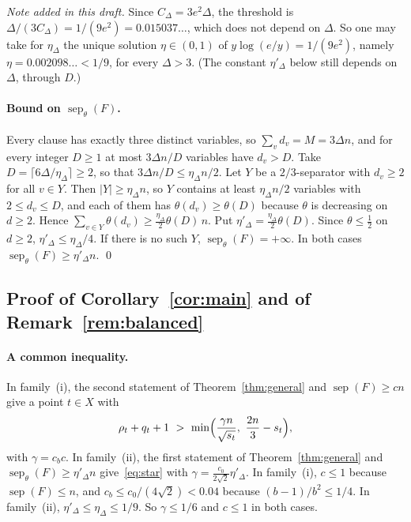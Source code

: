 \documentclass[11pt,a4paper]{article}
\theoremstyle{definition}
\theoremstyle{remark}
\newcommand{\sep}{\operatorname{sep}}
\newcommand{\sepw}{\operatorname{sep}_{\theta}}
\begin{document}
\emph{Note added in this draft.} Since $C_\Delta=3e^2\Delta$, the threshold is
$\Delta/(3C_\Delta)=1/(9e^2)=0.015037\ldots$, which does not depend on $\Delta$. So one may
take for $\eta_\Delta$ the unique solution $\eta\in(0,1)$ of $y\log(e/y)=1/(9e^2)$, namely
$\eta=0.002098\ldots<1/9$, for every $\Delta>3$. (The constant $\eta'_\Delta$ below still
depends on $\Delta$, through $D$.)

\paragraph{Bound on $\sepw(F)$.} Every clause has exactly three distinct variables, so
$\sum_vd_v=M=3\Delta n$, and for every integer $D\ge1$ at most $3\Delta n/D$ variables have
$d_v>D$. Take $D=\lceil6\Delta/\eta_\Delta\rceil\ge2$, so that $3\Delta n/D\le\eta_\Delta n/2$.
Let $Y$ be a $2/3$-separator with $d_v\ge2$ for all $v\in Y$. Then $|Y|\ge\eta_\Delta n$, so
$Y$ contains at least $\eta_\Delta n/2$ variables with $2\le d_v\le D$, and each of them has
$\theta(d_v)\ge\theta(D)$ because $\theta$ is decreasing on $d\ge2$. Hence
$\sum_{v\in Y}\theta(d_v)\ge\frac{\eta_\Delta}{2}\theta(D)\,n$. Put
$\eta'_\Delta=\frac{\eta_\Delta}{2}\theta(D)$. Since $\theta\le\frac12$ on $d\ge2$,
$\eta'_\Delta\le\eta_\Delta/4$. If there is no such $Y$, $\sepw(F)=+\infty$. In both cases
$\sepw(F)\ge\eta'_\Delta n$. \qed

\subsection{Proof of Corollary~\ref{cor:main} and of Remark~\ref{rem:balanced}}
\label{sec:proofcor}

\paragraph{A common inequality.} In family~(i), the second statement of
Theorem~\ref{thm:general} and $\sep(F)\ge cn$ give a point $t\in X$ with
\begin{equation}\label{eq:star}
\rho_t+q_t+1\ >\ \min\Bigl(\frac{\gamma n}{\sqrt{s_t}},\ \frac{2n}{3}-s_t\Bigr),
\end{equation}
with $\gamma=c_bc$. In family~(ii), the first statement of Theorem~\ref{thm:general} and
$\sepw(F)\ge\eta'_\Delta n$ give~\eqref{eq:star} with
$\gamma=\frac{c_0}{2\sqrt2}\eta'_\Delta$. In family~(i), $c\le1$ because $\sep(F)\le n$, and
$c_b\le c_0/(4\sqrt2)<0.04$ because $(b-1)/b^2\le1/4$. In family~(ii),
$\eta'_\Delta\le\eta_\Delta\le1/9$. So $\gamma\le1/6$ and $c\le1$ in both cases.
\end{document}
